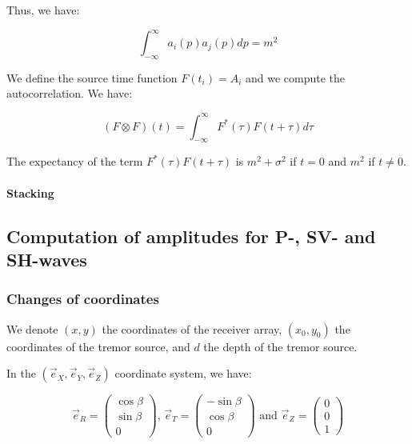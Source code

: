 \documentclass[main.tex]{subfiles}
\begin{document}
Thus, we have:

\begin{equation}
\int_{- \infty}^{\infty} a_i (p) a_j (p) dp = m^2
\end{equation}

We define the source time function $F (t_i) = A_i$ and we compute the autocorrelation. We have:

\begin{equation}
(F \otimes F) (t) = \int_{- \infty}^{\infty} F^* (\tau) F (t + \tau) d\tau
\end{equation}

The expectancy of the term $F^* (\tau) F (t + \tau)$ is $m^2 + \sigma^2$ if $t = 0$ and $m^2$ if $t \neq 0$.

\paragraph{Stacking}

\subsection{Computation of amplitudes for P-, SV- and SH-waves}

\subsubsection{Changes of coordinates}

We denote $(x, y)$ the coordinates of the receiver array, $(x_0, y_0)$ the coordinates of the tremor source, and $d$ the depth of the tremor source.

In the $(\vec{e}_X, \vec{e}_Y, \vec{e}_Z)$ coordinate system, we have:

\begin{equation}
\vec{e}_R = \begin{pmatrix}
\cos \beta \\
\sin \beta \\
0
\end{pmatrix} \text{, } \vec{e}_T = \begin{pmatrix}
- \sin \beta \\
\cos \beta \\
0
\end{pmatrix} \text{ and } \vec{e}_Z = \begin{pmatrix}
0 \\
0 \\
1
\end{pmatrix}
\end{equation}
\end{document}
